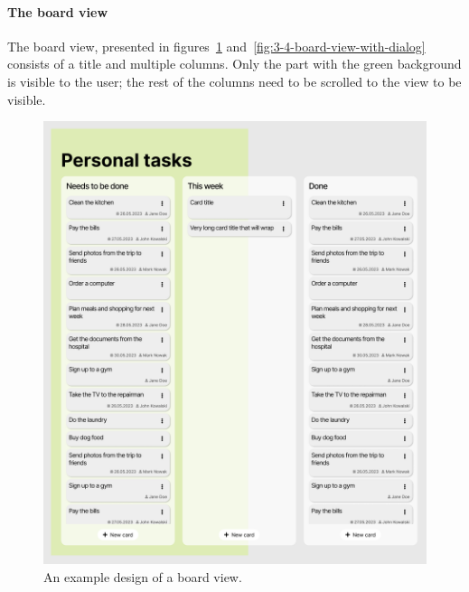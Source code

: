 
\paragraph{The board view}
The board view, presented in figures~\ref{fig:3-4-board-view} and~\ref{fig:3-4-board-view-with-dialog} consists of a title and multiple columns.
Only the part with the green background is visible to the user;
the rest of the columns need to be scrolled to the view to be visible.

\begin{figure}
    \centering
    \includegraphics[height=0.4\textheight]{./3-research-methodology/board-view}
    \caption{An example design of a board view.}
    \label{fig:3-4-board-view}
\end{figure}

